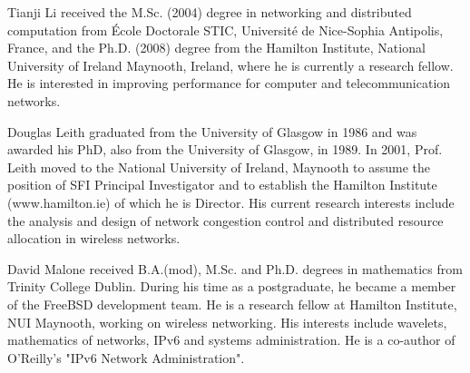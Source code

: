 \documentclass[10pt,twocolumn, journal]{IEEEtran}
\begin{document}
\begin{IEEEbiography}{Tianji Li}
received the M.Sc. (2004) degree in networking and
distributed computation from \'{E}cole Doctorale STIC,
Universit\'{e} de Nice-Sophia Antipolis, France, and the  Ph.D. (2008) degree from the Hamilton
Institute, National University of Ireland Maynooth, Ireland, where he is currently a research fellow. He is interested in improving performance for computer and telecommunication networks.
\end{IEEEbiography}


\begin{IEEEbiography}{Douglas Leith}
graduated from the University of Glasgow in 1986 and was awarded his PhD, also from the
University of Glasgow, in 1989. In 2001, Prof. Leith moved to the National University of
Ireland, Maynooth to assume the position of SFI Principal Investigator and to establish
the Hamilton Institute (www.hamilton.ie) of which he is Director.  His current research
interests  include the analysis and design of network congestion control and distributed
resource allocation in wireless networks.
\end{IEEEbiography}



\begin{IEEEbiography}{David Malone}
received B.A.(mod), M.Sc. and Ph.D. degrees in mathematics from Trinity College Dublin.
During his time as a postgraduate, he became a member of the FreeBSD development team. He
is a research fellow at Hamilton Institute, NUI Maynooth, working on wireless networking.
His interests include wavelets, mathematics of networks, IPv6 and systems administration.
He is a co-author of O'Reilly's "IPv6 Network Administration".
\end{IEEEbiography}
\end{document}
